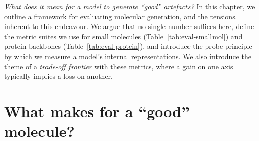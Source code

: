\documentclass[12pt,a4paper,twoside]{report}
\begin{document}


\emph{What does it mean for a model to generate ``good'' artefacts?} In this chapter, we outline a framework for evaluating molecular generation, and the tensions inherent to this endeavour. We argue that no single number suffices here, define the metric suites we use for small molecules (Table~\ref{tab:eval-smallmol}) and protein backbones (Table~\ref{tab:eval-protein}), and introduce the probe principle by which we measure a model's internal representations. We also introduce the theme of a \emph{trade-off frontier} with these metrics, where a gain on one axis typically implies a loss on another.

\section{What makes for a ``good'' molecule?}
\label{sec:eval-good}
\end{document}
